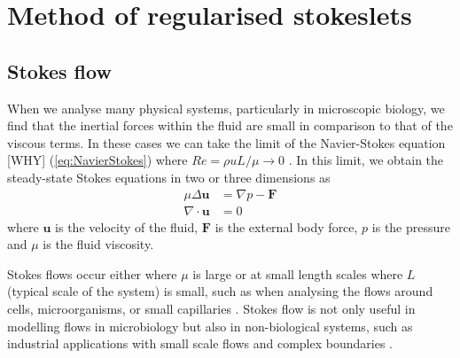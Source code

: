 \FloatBarrier
\section{Method of regularised stokeslets} \label{sec:MRS}
\subsection{Stokes flow}
When we analyse many physical systems, particularly in microscopic biology, we find that the inertial forces within the fluid are small in comparison to that of the viscous terms. In these cases we can take the limit of the Navier-Stokes equation [WHY] (\cref{eq:NavierStokes}) where $Re=\rho u L/\mu \to 0 $ \cite{Trombley2019BasicFlows}. In this limit, we obtain the steady-state Stokes equations in two or three dimensions as 
\begin{subequations}
\label{eq:StokesFlow}
\begin{align}
    \mu\Delta\boldsymbol{u} &= \nabla p - \boldsymbol{F} \label{eq:StokesFlow1} \\
    \nabla \cdot \boldsymbol{u} &= 0 \label{eq:StokesFlow2}
\end{align}
\end{subequations}
where $\bm{u}$ is the velocity of the fluid, $\bm{F}$ is the external body force, $p$ is the pressure and $\mu$ is the fluid viscosity.

Stokes flows occur either where $\mu$ is large or at small length scales where $L$ (typical scale of the system) is small, such as when analysing the flows around cells, microorganisms, or small capillaries \cite{Blake1972AOrganisms, Higdon1979APropulsion, Smith2009MathematicalFluids}. Stokes flow is not only useful in modelling flows in microbiology but also in non-biological systems, such as industrial applications with small scale flows and complex boundaries \cite{Liron1978StokesPipe, Liron1976StokesPlates}.

